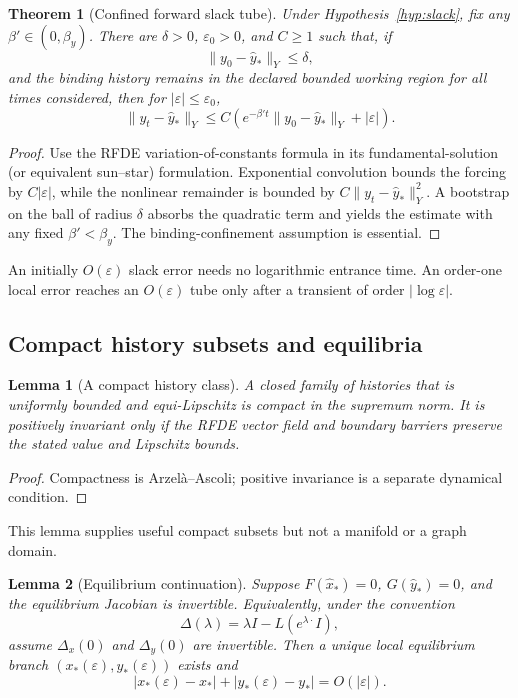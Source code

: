 \documentclass[11pt]{article}
\newtheorem{theorem}{Theorem}
\newtheorem{lemma}{Lemma}
\theoremstyle{definition}
\theoremstyle{remark}
\begin{document}
\begin{theorem}[Confined forward slack tube]
\label{thm:tube}
Under Hypothesis~\ref{hyp:slack}, fix any $\beta'\in(0,\beta_y)$. There are $\delta>0$, $\varepsilon_0>0$, and $C\ge1$ such that, if
\[
\|y_0-\widehat y_*\|_Y\le\delta,
\]
and the binding history remains in the declared bounded working region for all times considered, then for $|\varepsilon|\le\varepsilon_0$,
\[
\|y_t-\widehat y_*\|_Y
\le C\left(e^{-\beta't}\|y_0-\widehat y_*\|_Y+|\varepsilon|\right).
\]
\end{theorem}

\begin{proof}
Use the RFDE variation-of-constants formula in its fundamental-solution (or equivalent sun--star) formulation. Exponential convolution bounds the forcing by $C|\varepsilon|$, while the nonlinear remainder is bounded by $C\|y_t-\widehat y_*\|_Y^2$. A bootstrap on the ball of radius $\delta$ absorbs the quadratic term and yields the estimate with any fixed $\beta'<\beta_y$. The binding-confinement assumption is essential.\qedhere
\end{proof}

An initially $O(\varepsilon)$ slack error needs no logarithmic entrance time. An order-one local error reaches an $O(\varepsilon)$ tube only after a transient of order $|\log\varepsilon|$.

\subsection{Compact history subsets and equilibria}

\begin{lemma}[A compact history class]
\label{lem:equi}
A closed family of histories that is uniformly bounded and equi-Lipschitz is compact in the supremum norm. It is positively invariant only if the RFDE vector field and boundary barriers preserve the stated value and Lipschitz bounds.
\end{lemma}

\begin{proof}
Compactness is Arzel\`a--Ascoli; positive invariance is a separate dynamical condition.\qedhere
\end{proof}

This lemma supplies useful compact subsets but not a manifold or a graph domain.

\begin{lemma}[Equilibrium continuation]
\label{lem:eq}
Suppose $F(\widehat x_*)=0$, $G(\widehat y_*)=0$, and the equilibrium Jacobian is invertible. Equivalently, under the convention
\[
\Delta(\lambda)=\lambda I-L(e^{\lambda\cdot}I),
\]
assume $\Delta_x(0)$ and $\Delta_y(0)$ are invertible. Then a unique local equilibrium branch $(x_*(\varepsilon),y_*(\varepsilon))$ exists and
\[
|x_*(\varepsilon)-x_*|+|y_*(\varepsilon)-y_*|=O(|\varepsilon|).
\]
\end{lemma}
\end{document}

